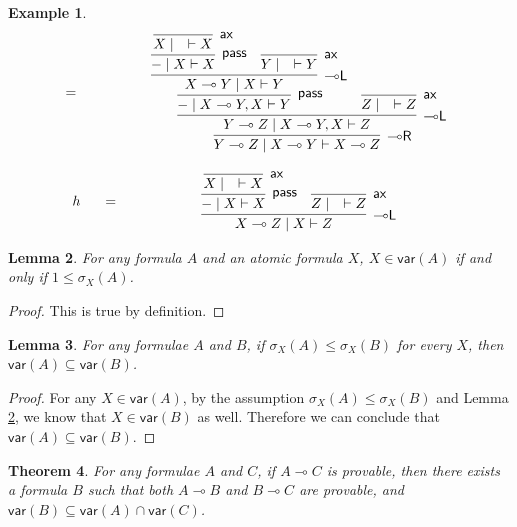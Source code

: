 \documentclass[sn-mathphys-num]{sn-jnl}%
\newcommand{\vd}{\vdash}
\newcommand{\pass}{\mathsf{pass}}
\newcommand{\ax}{\mathsf{ax}}
\newcommand{\lolli}{\multimap}
\newcommand{\lleft}{{\lolli}\mathsf{L}}
\newcommand{\lright}{{\lolli}\mathsf{R}}
\newcommand{\mf}[1]{\mathsf{#1}}
\newcommand{\gs}[1]{\sigma_{X} (#1)}
\newcommand{\vars}[1]{\mf{var} (#1)}
\theoremstyle{thmstyleone}%
\newtheorem{theorem}{Theorem}%
\theoremstyle{thmstyletwo}%
\newtheorem{example}[theorem]{Example}%
\newtheorem{lemma}[theorem]{Lemma}
\theoremstyle{thmstylethree}%
\begin{document}
\begin{example}
\begin{displaymath}
\begin{array}{lc}
      =&
      \quad
      \begin{array}{c}
        \infer[\lright]{Y \lolli Z \mid X \lolli Y \vd X \lolli Z}{
          \infer[\lleft]{Y \lolli Z \mid X \lolli Y , X \vd Z}{
            \infer[\pass]{{-} \mid X \lolli Y , X \vd Y}{
              \infer[\lleft]{X \lolli Y \mid X \vd Y}{
                \infer[\pass]{{-} \mid X \vd X}{
                  \infer[\ax]{X \mid \quad \vd X}{}
            }
            &
            \infer[\ax]{Y \mid \quad \vd Y}{}
          }
        }
            &
            \infer[\ax]{Z \mid \quad \vd Z}{}
          }
        }
      \end{array}
      \\[50pt]
      \begin{array}{c}
        h
      \end{array}
      \quad
      =&
      \quad
      \begin{array}{c}
        \infer[\lleft]{X \lolli Z \mid X \vd Z}{
          \infer[\pass]{{-} \mid X \vd X}{
            \infer[\ax]{X \mid \quad \vd X}{}
          }
          &
          \infer[\ax]{Z \mid \quad \vd Z}{}
        }
      \end{array}
    \end{array}
  \end{displaymath}
\end{example}
\begin{lemma}\label{lem:gs:vars:equiv}
  For any formula $A$ and an atomic formula $X$, $X \in \vars{A}$ if and only if $1 \leq \gs{A}$.
\end{lemma}
\begin{proof}
  This is true by definition.
\end{proof}
\begin{lemma}\label{lem:gs2vars}
  For any formulae $A$ and $B$, if $\gs{A} \leq \gs{B}$ for every $X$, then $\vars{A} \subseteq \vars{B}$.
\end{lemma}
\begin{proof}
  For any $X \in \vars{A}$, by the assumption $\gs{A} \leq \gs{B}$ and Lemma \ref{lem:gs:vars:equiv}, we know that $X \in \vars{B}$ as well.
  Therefore we can conclude that $\vars{A} \subseteq \vars{B}$.
\end{proof}
\begin{theorem}\label{thm:craig:intrp}
  For any formulae $A$ and $C$, if $A \lolli C$ is provable, then there exists a formula $B$ such that both $A \lolli B$ and $B \lolli C$ are provable, and $\vars{B} \subseteq \vars{A} \cap \vars{C}$.
\end{theorem}
\end{document}
